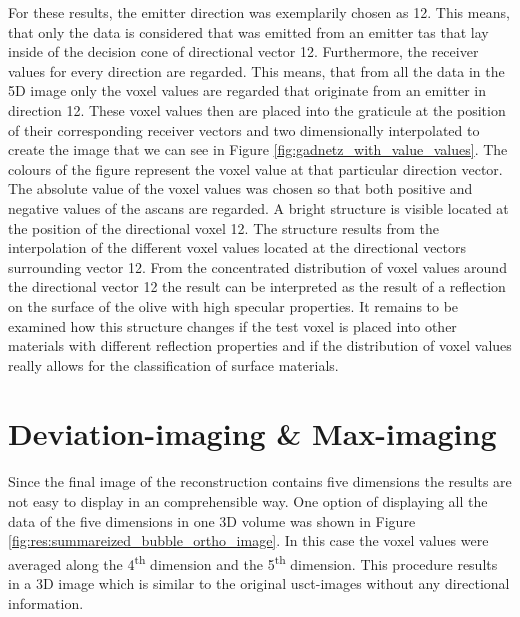 For these results, the emitter direction was exemplarily chosen as 12. This means, that only the data is considered that was emitted from an emitter \ac{tas} that lay inside of the decision cone of directional vector 12. Furthermore, the receiver values for every direction are regarded. This means, that from all the data in the 5D image only the voxel values are regarded that originate from an emitter in direction 12. These voxel values then are placed into the graticule at the position of their corresponding receiver vectors and two dimensionally interpolated to create the image that we can see in Figure \ref{fig:gadnetz_with_value_values}. The colours of the figure represent the voxel value at that particular direction vector. The absolute value of the voxel values was chosen so that both positive and negative values of the \acp{ascan} are regarded. A bright structure is visible located at the position of the directional voxel 12. The structure results from the interpolation of the different voxel values located at the directional vectors surrounding vector 12. From the concentrated distribution of voxel values around the directional vector 12 the result can be interpreted as the result of a reflection on the surface of the olive with high specular properties. It remains to be examined how this structure changes if the test voxel is placed into other materials with different reflection properties and if the distribution of voxel values really allows for the classification of surface materials.  






\section{Deviation-imaging \& Max-imaging}
\label{chap:devi_image}

Since the final image of the reconstruction contains five dimensions the results are not easy to display in an comprehensible way. One option of displaying all the data of the five dimensions in one 3D volume was shown in Figure \ref{fig:res:summareized_bubble_ortho_image}. In this case the voxel values were averaged along the 4\textsuperscript{th} dimension and the 5\textsuperscript{th} dimension. This procedure results in a 3D image which is similar to the original \ac{usct}-images without any directional information.   

\bigskip

